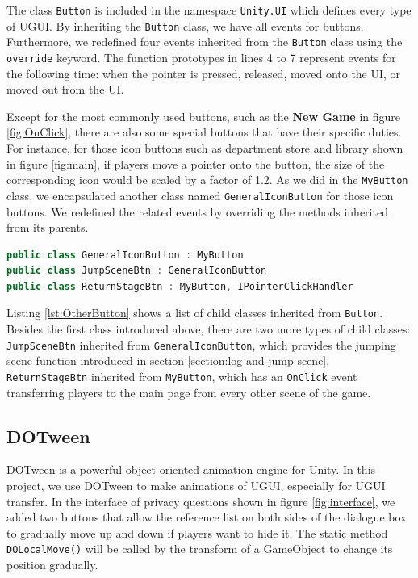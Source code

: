 \documentclass[msc,deptreport,ai]{infthesis}      %
\begin{document}
The class \texttt{Button} is included in the namespace \texttt{Unity.UI} which defines every type of UGUI. By inheriting the \texttt{Button} class, we have all events for buttons. Furthermore, we redefined four events inherited from the \texttt{Button} class using the \texttt{override} keyword. The function prototypes in lines 4 to 7 represent events for the following time: when the pointer is pressed, released, moved onto the UI, or moved out from the UI. 

Except for the most commonly used buttons, such as the \textbf{New Game} in figure \ref{fig:OnClick}, there are also some special buttons that have their specific duties. For instance, for those icon buttons such as department store and library shown in figure \ref{fig:main}, if players move a pointer onto the button, the size of the corresponding icon would be scaled by a factor of 1.2. As we did in the \texttt{MyButton} class, we encapsulated another class named \texttt{GeneralIconButton} for those icon buttons. We redefined the related events by overriding the methods inherited from its parents.

\begin{lstlisting}[caption={Different child class inherited from \texttt{Button} },label={lst:OtherButton},language=C++]
public class GeneralIconButton : MyButton
public class JumpSceneBtn : GeneralIconButton
public class ReturnStageBtn : MyButton, IPointerClickHandler
\end{lstlisting}

Listing \ref{lst:OtherButton} shows a list of child classes inherited from \texttt{Button}. Besides the first class introduced above, there are two more types of child classes: \texttt{JumpSceneBtn} inherited from \texttt{GeneralIconButton}, which provides the jumping scene function introduced in section \ref{section:log and jump-scene}. \texttt{ReturnStageBtn} inherited from \texttt{MyButton}, which has an \texttt{OnClick} event transferring players to the main page from every other scene of the game.

\subsection{DOTween}

DOTween is a powerful object-oriented animation engine for Unity. In this project, we use DOTween to make animations of UGUI, especially for UGUI transfer. In the interface of privacy questions shown in figure \ref{fig:interface}, we added two buttons that allow the reference list on both sides of the dialogue box to gradually move up and down if players want to hide it. The static method \texttt{DOLocalMove()} will be called by the transform of a GameObject to change its position gradually.
\end{document}
